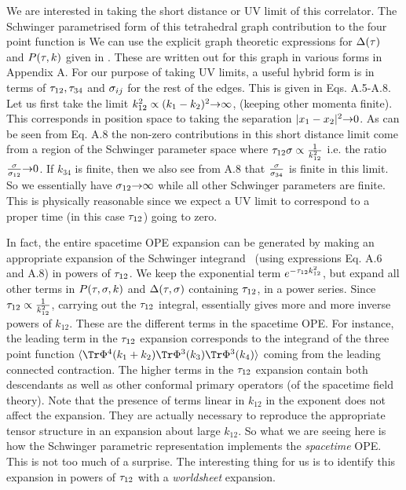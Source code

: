 We are interested in taking the short distance or UV limit of 
this correlator.
The Schwinger parametrised form of this 
tetrahedral graph contribution to the 
four point function is
\eqn{} 
We can use the explicit graph theoretic expressions for 
${\Delta} ({\tau})$ and $P({\tau}, k)$ given in \ffb . These are written out 
for this graph in various forms in Appendix A. 
For our purpose of taking UV limits, a useful hybrid form 
is in terms of 
${\tau}_{12},{\tau}_{34}$ and ${\sigma}_{ij}$ for the rest of the edges. This is 
given in Eqs. A.5-A.8. Let us first take the limit 
$k_{12}^2 \propto (k_1-k_2)^2{\rightarrow} \infty$, (keeping other momenta finite).
This corresponds in position space to taking the separation 
$|x_1-x_2|^2{\rightarrow}0$. As can be seen from Eq. A.8 the non-zero contributions
in this short distance limit  
come from a region of the Schwinger parameter space where 
${\tau}_{12}{\sigma}\propto {1\over k_{12}^2}$
i.e. the ratio ${{\sigma}\over {\sigma}_{12}}{\rightarrow} 0$. If $k_{34}$ 
is finite, then we also see from A.8 that ${{\sigma} \over {\sigma}_{34}}$ is 
finite in this limit. So we essentially have ${\sigma}_{12}{\rightarrow} \infty$ 
while all other Schwinger parameters are finite. This is physically 
reasonable since we expect a UV limit to correspond to  
a proper time (in this case ${\tau}_{12}$) going to zero. 

In fact, the entire spacetime OPE expansion can be generated by 
making an appropriate expansion of the Schwinger integrand \schfr\ 
(using expressions Eq. A.6 and A.8) in powers of ${\tau}_{12}$. We keep the 
exponential term  $e^{-{\tau}_{12}k_{12}^2}$, but expand all other terms in 
$P({\tau},{\sigma}, k)$ and ${\Delta}({\tau},{\sigma})$ containing ${\tau}_{12}$, in a power series. 
Since 
${\tau}_{12}\propto {1\over k_{12}^2}$, carrying out the ${\tau}_{12}$
integral, essentially gives more and more inverse powers of $k_{12}$.
These are the different terms in the spacetime OPE. For instance, the 
leading term in the ${\tau}_{12}$ expansion corresponds to the integrand of 
the three point function $\la \Tr\Phi^{4}(k_1+k_2)
\Tr\Phi^{3}(k_3)\Tr\Phi^{3}(k_4)\ra$ coming from the leading connected 
contraction. The higher terms in the ${\tau}_{12}$ expansion contain 
both descendants as well as other conformal primary operators 
(of the spacetime field theory). 
Note that the presence of terms linear in $k_{12}$ in the exponent
does not affect the expansion. They are actually necessary to reproduce
the appropriate tensor structure in an expansion about large $k_{12}$. 
So what we are seeing here is
how the Schwinger parametric representation implements the 
{\it spacetime} OPE. This is not too much of a surprise. 
The interesting thing for us is to identify this expansion in 
powers of ${\tau}_{12}$ with a {\it worldsheet} expansion. 

